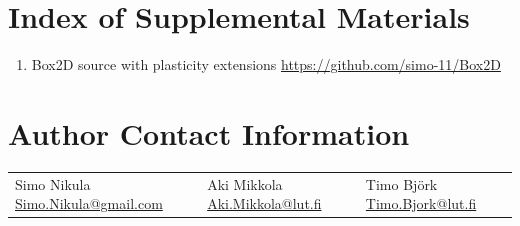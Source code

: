\documentclass{jcgt}
\begin{document}
\small



\section*{Index of Supplemental Materials}

\begin{enumerate}
\item Box2D source with plasticity extensions 
 \href{https://github.com/simo-11/Box2D}{https://github.com/simo-11/Box2D}

\end{enumerate}

\section*{Author Contact Information}

\hspace{-2mm}\begin{tabular}{p{}p{}p{}}
Simo Nikula\newline
\href{mailto:Simo.Nikula@gmail.com}{Simo.Nikula@gmail.com}
&
Aki Mikkola\newline
\href{mailto:Aki.Mikkola@lut.fi}{Aki.Mikkola@lut.fi}
&
Timo Björk\newline
\href{mailto:Timo.Bjork@lut.fi}{Timo.Bjork@lut.fi}
\end{tabular}


\afterdoc
\end{document}
